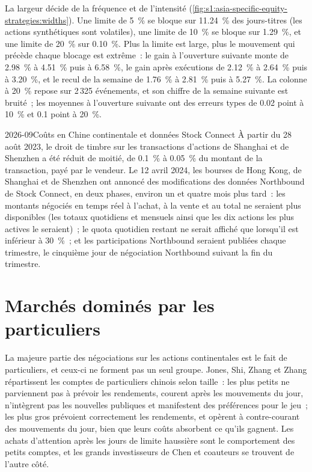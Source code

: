 La largeur décide de la fréquence et de l'intensité (\cref{fig:s1:asia-specific-equity-strategies:widths}). Une limite de 5~\% se bloque sur 11.24~\% des jours-titres (les
actions synthétiques sont volatiles), une limite de 10~\% se bloque sur 1.29~\%, et une limite de 20~\% sur 0.10~\%. Plus la limite est large, plus le mouvement qui précède chaque blocage est extrême~: le
gain à l'ouverture suivante monte de 2.98~\% à 4.51~\% puis à 6.58~\%, le gain après exécutions de 2.12~\% à 2.64~\% puis à 3.20~\%, et le recul de la semaine de 1.76~\% à 2.81~\% puis
à 5.27~\%. La colonne à 20~\% repose sur 2\,325 événements, et son chiffre de la semaine suivante est bruité~; les moyennes à l'ouverture suivante ont des erreurs types de 0.02 point à 10~\% et
0.1 point à 20~\%.

\begin{dated}{2026-09}{Coûts en Chine continentale et données Stock Connect}\label{dat:s1:asia-specific-equity-strategies:connect}
À partir du 28 août 2023, le droit de timbre sur les transactions d'actions de Shanghai et de Shenzhen a été réduit de moitié, de 0.1~\% à 0.05~\% du montant de la transaction, payé par le
vendeur. Le 12 avril 2024, les bourses de Hong Kong, de Shanghai et de Shenzhen ont annoncé des modifications des données Northbound de Stock Connect, en deux phases, environ un
et quatre mois plus tard~: les montants négociés en temps réel à l'achat, à la vente et au total ne seraient plus disponibles (les totaux quotidiens et mensuels ainsi que les dix actions les plus actives
le seraient)~; le quota quotidien restant ne serait affiché que lorsqu'il est inférieur à 30~\%~; et les participations Northbound seraient publiées chaque trimestre, le cinquième
jour de négociation Northbound suivant la fin du trimestre.
\end{dated}

\section{Marchés dominés par les particuliers}

La majeure partie des négociations sur les actions continentales est le fait de particuliers, et ceux-ci ne forment pas un seul groupe. Jones, Shi, Zhang et Zhang répartissent les comptes de particuliers chinois selon
taille~: les plus petits ne parviennent pas à prévoir les rendements, courent après les mouvements du jour, n'intègrent pas les nouvelles publiques et manifestent des préférences pour le jeu~; les plus gros prévoient
correctement les rendements, et opèrent à contre-courant des mouvements du jour, bien que leurs coûts absorbent ce qu'ils gagnent. Les achats d'attention après les jours de limite haussière sont le
comportement des petits comptes, et les grands investisseurs de Chen et coauteurs se trouvent de l'autre côté.

